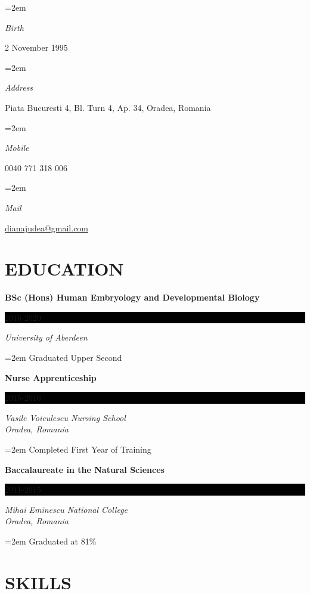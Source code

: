 \documentclass[paper=a4,fontsize=11pt]{scrartcl} %
\newlength{\spacebox}
\newcommand{\sepspace}{\vspace*{1em}}		%
\newcommand{\NewPart}[1]{\section*{\uppercase{{#1}}}}
\newcommand{\PersonalEntry}[2]{
		\noindent\hangindent=2em\hangafter=0 %
		\parbox{\spacebox}{        %
		\textit{#1}}		       %
		\hspace{1.5em} #2 \par}    %
\newcommand{\EducationEntry}[4]{
		\noindent \textbf{#1} \hfill      %
		\colorbox{Black}{%
			\parbox{6em}{%
			\hfill\color{White}#2}} \par  %
		\noindent \textit{#3} \par        %
		\noindent\hangindent=2em\hangafter=0 \small #4 %
		\normalsize \par}
\begin{document}

  \footnotesize

  \PersonalEntry{Birth}{2 November 1995}
  \PersonalEntry{Address}{Piata Bucuresti 4, Bl.  Turn 4, Ap.  34, Oradea, Romania}
  \PersonalEntry{Mobile}{0040 771 318 006}
  \PersonalEntry{Mail}{\url{dianajudea@gmail.com}}
  
  \normalsize

  \NewPart{Education}{}

  \EducationEntry{BSc (Hons) Human Embryology and Developmental Biology}{2016-2020}{University of Aberdeen}{Graduated Upper Second}

    \vspace{3pt}

  \EducationEntry{Nurse Apprenticeship}{2015-2016}{Vasile Voiculescu Nursing School \\ Oradea, Romania}{Completed First Year of Training}

    \vspace{3pt}

  \EducationEntry{Baccalaureate in the Natural Sciences}{2011-2015}{Mihai Eminescu National College \\ Oradea, Romania}{Graduated at 81\%}

  \NewPart{Skills}{}
\end{document}
